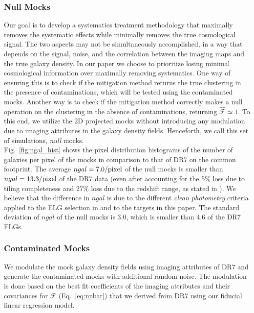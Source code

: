 \subsubsection{Null Mocks}
Our goal is to develop a systematics treatment methodology that maximally removes the systematic effects while minimally removes the true cosmological signal. The two aspects may not be simultaneously accomplished, in a way that depends on the signal, noise, and the correlation between the imaging maps and the true galaxy density. In our paper we choose to prioritize losing minimal cosmological information over maximally removing systematics. One way of ensuring this is to check if the mitigation method returns the true clustering in the presence of contaminations, which will be tested using the contaminated mocks. Another way is to check if the mitigation method correctly makes a null operation on the clustering in the absence of contaminations, returning $\hat{\mathcal{F}}\simeq 1$. To this end, we utilize the 2D projected mocks without introducing any modulation due to imaging attributes in the galaxy density fields. Henceforth, we call this set of simulations, \textit{null} mocks.\\

Fig.~\ref{fig:ngal_hist} shows the pixel distribution histograms of the number of galaxies per pixel of the mocks in comparison to that of DR7 on the common footprint. The average $ngal=7.0/{\rm pixel}$ of the null mocks is smaller than $ngal=13.3/{\rm pixel}$ of the DR7 data (even after accounting for the 5\% loss due to tiling completeness and 27\% loss due to the redshift range, as stated in \citet{Raichoor2017MNRAS.471.3955R}). We believe that the difference in $ngal$ is due to the different \textit{clean photometry} criteria applied to the ELG selection in \citet{Raichoor2017MNRAS.471.3955R} and to the targets in this paper. The standard deviation of $ngal$ of the null mocks is 3.0, which is smaller than 4.6 of the DR7 ELGs.

\subsubsection{Contaminated Mocks}
We modulate the mock galaxy density fields using imaging attributes of DR7 and generate the contaminated mocks with additional random noise. The modulation is done based on the best fit coefficients of the imaging attributes and their covariances for $\mathcal{F}$ (Eq.~\ref{eq:nnbar}) that we derived from DR7 using our fiducial linear regression model.\\


